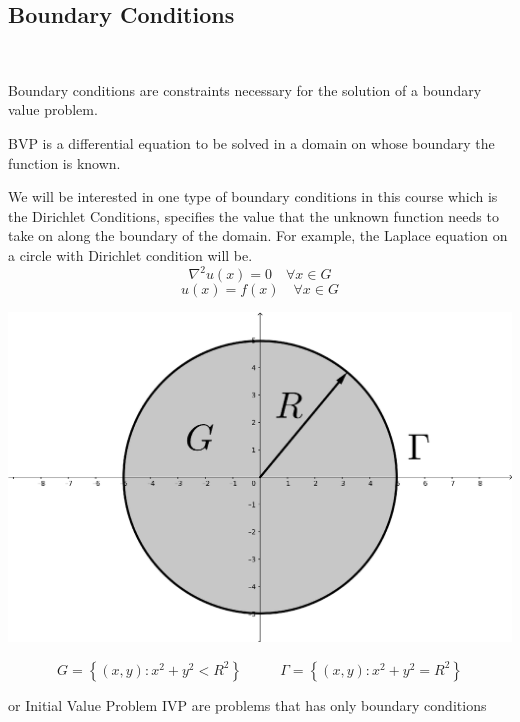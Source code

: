 \documentclass[]{article}
\begin{document}
\subsection{Boundary Conditions}
\
\begin{definition}
    Boundary conditions are constraints necessary for the solution of a boundary value problem.
\end{definition}
\begin{definition}
    BVP is a differential equation to be solved in a domain on whose boundary the function is known.
\end{definition}
We will be interested in one type of boundary conditions in this course which is the Dirichlet Conditions, specifies the value that the unknown function needs to take on along the boundary of the domain. For example, the Laplace equation on a circle with Dirichlet condition will be.
\[
    \nabla^2 u(x) = 0 \quad \forall x \in G    
\]
\[
    u(x) = f(x) \quad \forall x \in G    
\]
\begin{center}
\includegraphics[scale=0.1]{laplacecircle.png} 
\end{center}
\[
    G = \left\lbrace (x,y):x^2+y^2 < R^2 \right\rbrace  \;\;\;\;\;\;\;\;\;\ \Gamma = \left\lbrace (x,y):x^2+y^2 = R^2 \right\rbrace    
\]
\begin{definition}
    or Initial Value Problem IVP are problems that has only boundary conditions
\end{definition}
\end{document}
